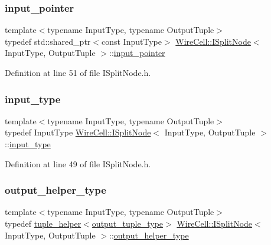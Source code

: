 \subsubsection{\texorpdfstring{input\+\_\+pointer}{input\_pointer}}
{\footnotesize\ttfamily template$<$typename Input\+Type, typename Output\+Tuple$>$ \\
typedef std\+::shared\+\_\+ptr$<$const Input\+Type$>$ \hyperlink{class_wire_cell_1_1_i_split_node}{Wire\+Cell\+::\+I\+Split\+Node}$<$ Input\+Type, Output\+Tuple $>$\+::\hyperlink{class_wire_cell_1_1_i_split_node_a270990964b36cf939159efa595779407}{input\+\_\+pointer}}



Definition at line 51 of file I\+Split\+Node.\+h.

\mbox{\label{class_wire_cell_1_1_i_split_node_aa8893ad410e8ed0aaf420a77475ffcc9}} 
\subsubsection{\texorpdfstring{input\+\_\+type}{input\_type}}
{\footnotesize\ttfamily template$<$typename Input\+Type, typename Output\+Tuple$>$ \\
typedef Input\+Type \hyperlink{class_wire_cell_1_1_i_split_node}{Wire\+Cell\+::\+I\+Split\+Node}$<$ Input\+Type, Output\+Tuple $>$\+::\hyperlink{class_wire_cell_1_1_i_split_node_aa8893ad410e8ed0aaf420a77475ffcc9}{input\+\_\+type}}



Definition at line 49 of file I\+Split\+Node.\+h.

\mbox{\label{class_wire_cell_1_1_i_split_node_aad34eb757f9df60286669875d91173a1}} 
\subsubsection{\texorpdfstring{output\+\_\+helper\+\_\+type}{output\_helper\_type}}
{\footnotesize\ttfamily template$<$typename Input\+Type, typename Output\+Tuple$>$ \\
typedef \hyperlink{struct_wire_cell_1_1tuple__helper}{tuple\+\_\+helper}$<$\hyperlink{class_wire_cell_1_1_i_split_node_acd382a6b5a9c3f322943ce2dd66fa7f4}{output\+\_\+tuple\+\_\+type}$>$ \hyperlink{class_wire_cell_1_1_i_split_node}{Wire\+Cell\+::\+I\+Split\+Node}$<$ Input\+Type, Output\+Tuple $>$\+::\hyperlink{class_wire_cell_1_1_i_split_node_aad34eb757f9df60286669875d91173a1}{output\+\_\+helper\+\_\+type}}



